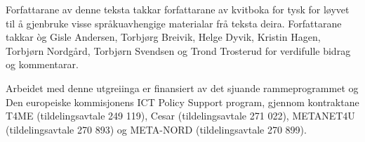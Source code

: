                                                                            

Forfattarane av denne teksta takkar forfattarane av kvitboka for tysk for løyvet til å gjenbruke visse språkuavhengige materialar frå teksta deira. Forfattarane takkar òg Gisle Andersen, Torbjørg Breivik, Helge Dyvik, Kristin Hagen, Torbjørn Nordgård, Torbjørn Svendsen og Trond Trosterud for verdifulle bidrag og kommentarar.

Arbeidet med denne utgreiinga er finansiert av det sjuande rammeprogrammet og Den europeiske kommisjonens ICT Policy Support program, gjennom kontraktane T4ME (tildelingsavtale 249 119), Cesar (tildelingsavtale 271 022), METANET4U (tildelingsavtale 270 893) og META-NORD (tildelingsavtale 270 899).
